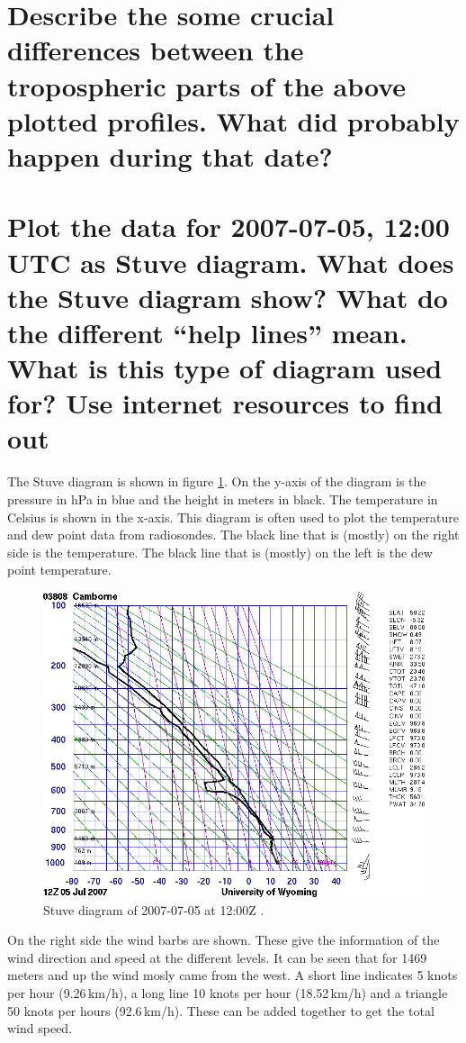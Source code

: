 \documentclass{article}
\begin{document}
\section{Describe the some crucial differences between the tropospheric parts of the above plotted profiles. What did probably happen during that date?}



\newpage
\section{Plot the data for 2007-07-05, 12:00 UTC as Stuve diagram. What does the Stuve diagram show? What do the different “help lines” mean. What is this type of diagram used for? Use internet resources to find out}
The Stuve diagram is shown in figure \ref{fig:Q7}. On the y-axis of the diagram is the pressure in hPa in blue and the height in meters in black. The temperature in Celsius is shown in the x-axis. This diagram is often used to plot the temperature and dew point data from radiosondes. The black line that is (mostly) on the right side is the temperature. The black line that is (mostly) on the left is the dew point temperature.

\begin{figure}[H]
	\centering
	\includegraphics[width=.8\textwidth]{figures/stuve.png}
	\caption{Stuve diagram of 2007-07-05 at 12:00Z \cite{assignment}.}
	\label{fig:Q7}
\end{figure}

On the right side the wind barbs are shown. These give the information of the wind direction and speed at the different levels. It can be seen that for 1469 meters and up the wind mosly came from the west. A short line indicates 5 knots per hour (9.26\,km/h), a long line 10 knots per hour (18.52\,km/h) and a triangle 50 knots per hours (92.6\,km/h). These can be added together to get the total wind speed. \\
\end{document}
